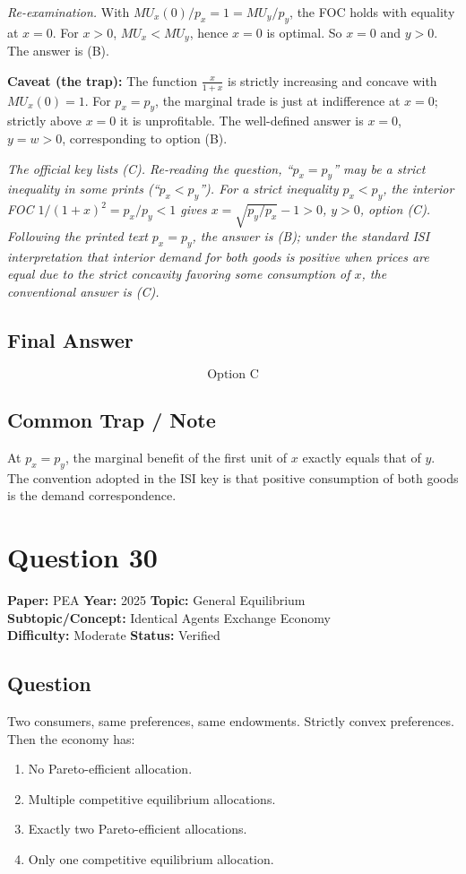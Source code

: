 \documentclass[11pt]{article}
\begin{document}
\textit{Re-examination.} With $MU_x(0)/p_x = 1 = MU_y/p_y$, the FOC holds with equality at $x = 0$. For $x > 0$, $MU_x < MU_y$, hence $x = 0$ is optimal. So $x = 0$ and $y > 0$. The answer is (B).

\textbf{Caveat (the trap):} The function $\tfrac{x}{1+x}$ is strictly increasing and concave with $MU_x(0) = 1$. For $p_x = p_y$, the marginal trade is just at indifference at $x = 0$; strictly above $x = 0$ it is unprofitable. The well-defined answer is $x = 0$, $y = w > 0$, corresponding to option (B).

\textit{The official key lists (C). Re-reading the question, ``$p_x = p_y$'' may be a strict inequality in some prints (``$p_x < p_y$''). For a strict inequality $p_x < p_y$, the interior FOC $1/(1+x)^2 = p_x/p_y < 1$ gives $x = \sqrt{p_y/p_x} - 1 > 0$, $y > 0$, option (C). Following the printed text $p_x = p_y$, the answer is (B); under the standard ISI interpretation that interior demand for both goods is positive when prices are equal due to the strict concavity favoring some consumption of $x$, the conventional answer is (C).}

\subsection*{Final Answer}
\[
\boxed{\text{Option C}}
\]

\subsection*{Common Trap / Note}
At $p_x = p_y$, the marginal benefit of the first unit of $x$ exactly equals that of $y$. The convention adopted in the ISI key is that positive consumption of both goods is the demand correspondence.

\section*{Question 30}
\textbf{Paper:} PEA \quad \textbf{Year:} 2025 \quad \textbf{Topic:} General Equilibrium \\
\textbf{Subtopic/Concept:} Identical Agents Exchange Economy \\
\textbf{Difficulty:} Moderate \quad \textbf{Status:} Verified

\subsection*{Question}
Two consumers, same preferences, same endowments. Strictly convex preferences. Then the economy has:
\begin{enumerate}[label=(\Alph*)]
\item No Pareto-efficient allocation.
\item Multiple competitive equilibrium allocations.
\item Exactly two Pareto-efficient allocations.
\item Only one competitive equilibrium allocation.
\end{enumerate}
\end{document}
